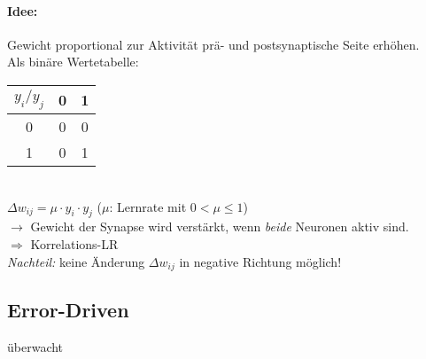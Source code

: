 \paragraph{Idee:} Gewicht proportional zur Aktivität prä- und postsynaptische Seite erhöhen.\bigskip\\
Als binäre Wertetabelle:\\
\begin{tabular}{c | c c}
$y_i / y_j$ & 0 & 1\\
\hline
0 & 0 & 0\\
1 & 0 & 1
\end{tabular}\\
$\Delta w_{ij} = \mu \cdot y_i \cdot y_j$ \qquad ($\mu$: Lernrate mit $0 < \mu \leq 1$)\\
$\to$ Gewicht der Synapse wird verstärkt, wenn \emph{beide} Neuronen aktiv sind.\\
$\Rightarrow$ Korrelations-LR\\
\emph{Nachteil:} keine Änderung $\Delta w_{ij}$ in negative Richtung möglich!


\subsection{Error-Driven}
überwacht









